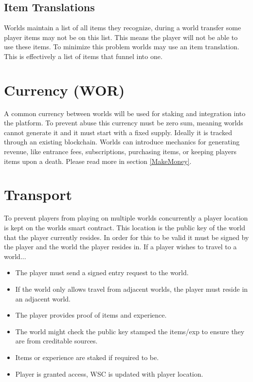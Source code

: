 \documentclass[runningheads,a4paper]{llncs}
\begin{document}
\subsection{Item Translations}
\label{ItemTranslations}
Worlds maintain a list of all items they recognize, during a world transfer some player items may not be on this list. This means the player will not be able to use these items. To minimize this problem worlds may use an item translation. This is effectively a list of items that funnel into one. 

\section{Currency (WOR)}
\label{money}
A common currency between worlds will be used for staking and integration into the platform. To prevent abuse this currency must be zero sum, meaning worlds cannot generate it and it must start with a fixed supply. Ideally it is tracked through an existing blockchain. Worlds can introduce mechanics for generating revenue, like entrance fees, subscriptions, purchasing items, or keeping players items upon a death. Please read more in section \ref{MakeMoney}.

\section{Transport}
To prevent players from playing on multiple worlds concurrently a player location is kept on the worlds smart contract. This location is the public key of the world that the player currently resides. In order for this to be valid it must be signed by the player and the world the player resides in. If a player wishes to travel to a world... 

\begin{itemize}
\item{The player must send a signed entry request to the world.}
\item{If the world only allows travel from adjacent worlds, the player must reside in an adjacent world.}
\item{The player provides proof of items and experience.}
\item{The world might check the public key stamped the items/exp to ensure they are from creditable sources.}
\item{Items or experience are staked if required to be.}
\item{Player is granted access, WSC is updated with player location.}
\end{itemize}
\end{document}
